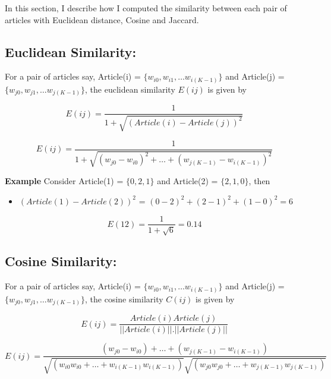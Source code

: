 \documentclass[journal,onecolumn]{IEEEtran}
\begin{document}
In this section, I describe how I computed the similarity between each pair of articles with Euclidean distance, Cosine and Jaccard.

\subsection{Euclidean Similarity:}

For a pair of articles say, Article(i) = $\{w_{i0}, w_{i1}, \dots w_{i(K-1)} \}$ and Article(j) = $\{w_{j0}, w_{j1}, \dots w_{j(K-1)} \}$, the euclidean similarity $E(ij)$ is given by

\begin{equation} 
E(ij) = \frac{1}{1 + \sqrt{(Article(i) - Article(j))^2}}
\end{equation}

\begin{equation}\label{euclid}
E(ij) = \frac{1}{1 + \sqrt{(w_{j0} - w_{i0})^2 + \dots + (w_{j(K-1)} - w_{i(K-1)})^2  }}
\end{equation}

\textbf{Example }Consider Article(1) = $\{0, 2, 1\}$ and Article(2) = $\{2, 1, 0\}$, then
\begin{itemize}[label={}]
\item $( Article(1) - Article(2))^2$ = $ (0 -2) ^2 + (2 - 1)^2 + (1 - 0)^2 = 6$

\end{itemize}

$$ E(12) = \frac{1}{1 + \sqrt{6}} = 0.14$$

\subsection{Cosine Similarity:}

For a pair of articles say, Article(i) = $\{w_{i0}, w_{i1}, \dots w_{i(K-1)} \}$ and Article(j) = $\{w_{j0}, w_{j1}, \dots w_{j(K-1)} \}$, the cosine similarity $C(ij)$ is given by

\begin{equation}
E(ij) = \frac{Article(i) Article(j)}{||Article(i)|| . ||Article(j)||}
\end{equation}

\begin{equation}\label{cosine}
E(ij) = \frac{(w_{j0} - w_{i0}) + \dots + (w_{j(K-1)} - w_{i(K-1)}) }{\sqrt{(w_{i0}w_{i0} + \dots + w_{i(K-1)}w_{i(K-1)})} \sqrt{(w_{j0}w_{j0} + \dots + w_{j(K-1)}w_{j(K-1)})}}
\end{equation}
\end{document}
